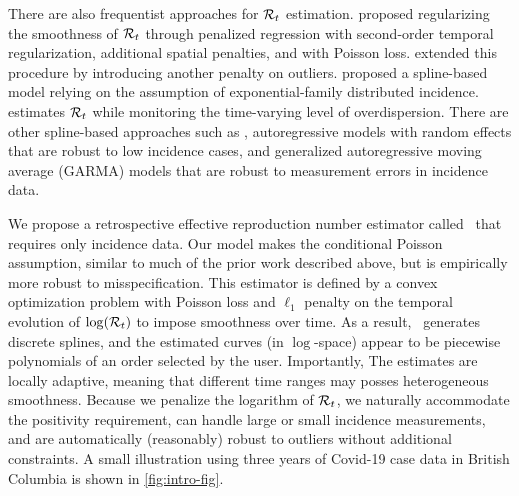There are also frequentist approaches for $\mathcal{R}_t$ estimation.
\citet{abry2020spatial} proposed regularizing the smoothness of $\mathcal{R}_t$
through penalized
regression with second-order temporal regularization, additional spatial
penalties, and with Poisson loss. \citet{pascal2022nonsmooth}
extended this procedure by introducing another penalty on outliers.
%
\cite{pircalabelu2023spline} proposed a spline-based model relying on the 
assumption of exponential-family distributed incidence. 
\cite{ho2023accounting} estimates $\mathcal{R}_t$ while monitoring the time-varying
level of overdispersion. 
%
There are other spline-based approaches such as
\cite{azmon2014estimation,gressani2021approximate},
autoregressive models with random effects \citep{jin2023epimix} that are robust
to low incidence cases, and generalized autoregressive moving average (GARMA)
models \citep{hettinger2023estimating} that are robust to measurement errors in
incidence data. 


We propose a retrospective effective reproduction number estimator
called \RtEstim\ that requires only incidence data. Our model makes the
conditional Poisson assumption, similar to much of the prior work described
above, but is empirically more robust to misspecification. This estimator is defined by a
convex optimization problem with Poisson loss and $\ell_1$ penalty on the
temporal evolution of $\log(\mathcal{R}_t)$ to impose smoothness over time. 
As a result, \RtEstim\ generates discrete splines, and the estimated curves (in
$\log$-space) appear to be piecewise polynomials of an order selected by the
user. Importantly, The estimates are locally adaptive, meaning that different
time ranges may posses heterogeneous smoothness. Because we penalize the
logarithm of $\mathcal{R}_t$, we naturally accommodate the positivity requirement, can
handle large or small incidence measurements, and are automatically (reasonably)
robust to outliers without additional constraints. A small illustration using
three years of Covid-19 case data in British Columbia is shown in \autoref{fig:intro-fig}.

